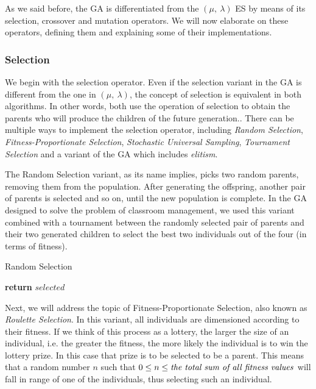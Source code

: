 As we said before, the GA is differentiated from the $(\mu,\ \lambda)$ ES by means of its selection, crossover and mutation operators. We will now elaborate on these operators, defining them and explaining some of their implementations.

\subsubsection{Selection}

We begin with the selection operator. Even if the selection variant in the GA is different from the one in $(\mu,\ \lambda)$, the concept of selection is equivalent in both algorithms. In other words, both use the operation of selection to obtain the parents who will produce the children of the future generation.. There can be multiple ways to implement the selection operator, including \textit{Random Selection}, \textit{Fitness-Proportionate Selection}, \textit{Stochastic Universal Sampling}, \textit{Tournament Selection} and a variant of the GA which includes \textit{elitism}.

The Random Selection variant, as its name implies, picks two random parents, removing them from the population. After generating the offspring, another pair of parents is selected and so on, until the new population is complete. In the GA designed to solve the problem of classroom management, we used this variant combined with a tournament between the randomly selected pair of parents and their two generated children to select the best two individuals out of the four (in terms of fitness).

\begin{algorithm}[H]
    \caption{Random Selection}
    \label{theory-ga-ransel}
    \begin{algorithmic}[1]
             
            \State \textbf{return} $selected$
        \EndProcedure
    \end{algorithmic}
\end{algorithm}

Next, we will address the topic of Fitness-Proportionate Selection, also known as \textit{Roulette Selection}. In this variant, all individuals are dimensioned according to their fitness. If we think of this process as a lottery, the larger the size of an individual, i.e. the greater the fitness, the more likely the individual is to win the lottery prize. In this case that prize is to be selected to be a parent. This means that a random number $n$ such that $0 \leq n \leq \text{\textit{the total sum of all fitness values}}$ will fall in range of one of the individuals, thus selecting such an individual.

